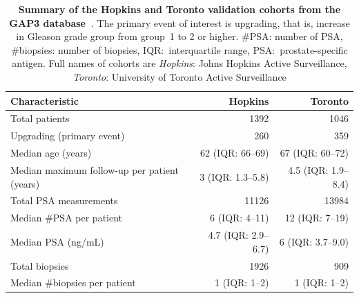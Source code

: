 \begin{table}
\small\sf\centering
\caption{\textbf{Summary of the Hopkins and Toronto validation cohorts from the GAP3 database~\citep{gap3_2018}}. The primary event of interest is upgrading, that is, increase in Gleason grade group from group~1 to 2 or higher. \#PSA: number of PSA, \#biopsies: number of biopsies, IQR:~interquartile range, PSA:~prostate-specific antigen. Full names of cohorts are \textit{Hopkins}: Johns Hopkins Active Surveillance, \textit{Toronto}: University of Toronto Active Surveillance}
\label{table:gap3_summary_1}
\begin{tabular}{lrr}
\hline
\textbf{Characteristic} & \textbf{Hopkins} & \textbf{Toronto}\\
\hline
Total patients & 1392 & 1046\\
Upgrading (primary event) & 260 & 359\\
\hline
Median age (years) & 62 (IQR: 66--69) & 67 (IQR: 60--72)\\
Median maximum follow-up per patient (years) &  3 (IQR: 1.3--5.8) & 4.5 (IQR: 1.9--8.4)\\
Total PSA measurements & 11126 & 13984\\
Median \#PSA per patient &  6 (IQR: 4--11) & 12 (IQR: 7--19)\\
Median PSA (ng/mL) & 4.7 (IQR: 2.9--6.7) & 6 (IQR: 3.7--9.0)\\
Total biopsies & 1926 & 909\\
Median \#biopsies per patient &  1 (IQR: 1--2) &  1 (IQR: 1--2)\\
\hline
\end{tabular}
\end{table}

